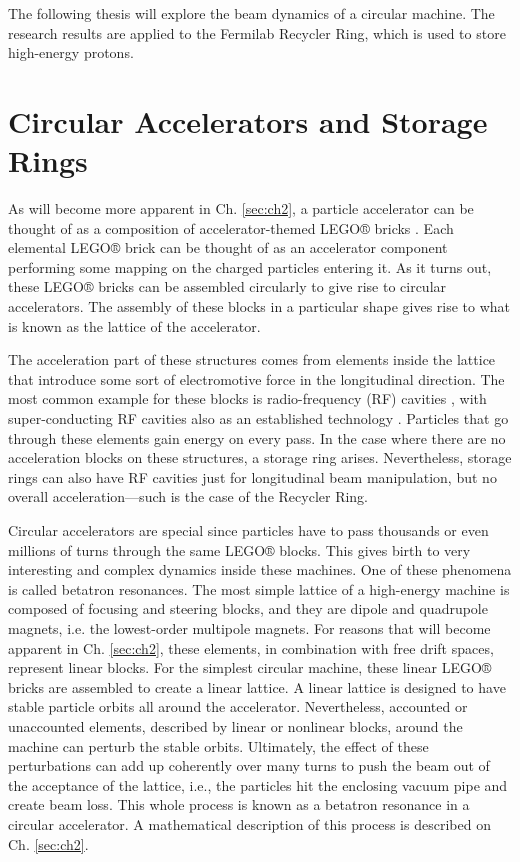 The following thesis will explore the beam dynamics of a circular machine. The research results are applied to the Fermilab Recycler Ring, which is used to store high-energy protons.

\section{Circular Accelerators and Storage Rings}

As will become more apparent in Ch. \ref{sec:ch2}, a particle accelerator can be thought of as a composition of accelerator-themed LEGO® bricks \cite{forest}. Each elemental LEGO® brick can be thought of as an accelerator component performing some mapping on the charged particles entering it. As it turns out, these LEGO® bricks can be assembled circularly to give rise to circular accelerators. The assembly of these blocks in a particular shape gives rise to what is known as the lattice of the accelerator.

The acceleration part of these structures comes from elements inside the lattice that introduce some sort of electromotive force in the longitudinal direction. The most common example for these blocks is radio-frequency (RF) cavities \cite{sylee}, with super-conducting RF cavities also as an established technology \cite{srfcavs}. Particles that go through these elements gain energy on every pass. In the case where there are no acceleration blocks on these structures, a storage ring arises. Nevertheless, storage rings can also have RF cavities just for longitudinal beam manipulation, but no overall acceleration---such is the case of the Recycler Ring.    

Circular accelerators are special since particles have to pass thousands or even millions of turns through the same LEGO® blocks. This gives birth to very interesting and complex dynamics inside these machines. One of these phenomena is called betatron resonances. The most simple lattice of a high-energy machine is composed of focusing and steering blocks, and they are dipole and quadrupole magnets, i.e. the lowest-order multipole magnets. For reasons that will become apparent in Ch. \ref{sec:ch2}, these elements, in combination with free drift spaces, represent linear blocks. For the simplest circular machine, these linear LEGO® bricks are assembled to create a linear lattice. A linear lattice is designed to have stable particle orbits all around the accelerator. Nevertheless, accounted or unaccounted elements, described by linear or nonlinear blocks, around the machine can perturb the stable orbits. Ultimately, the effect of these perturbations can add up coherently over many turns to push the beam out of the acceptance of the lattice, i.e., the particles hit the enclosing vacuum pipe and create beam loss. This whole process is known as a betatron resonance in a circular accelerator. A mathematical description of this process is described on Ch. \ref{sec:ch2}.

